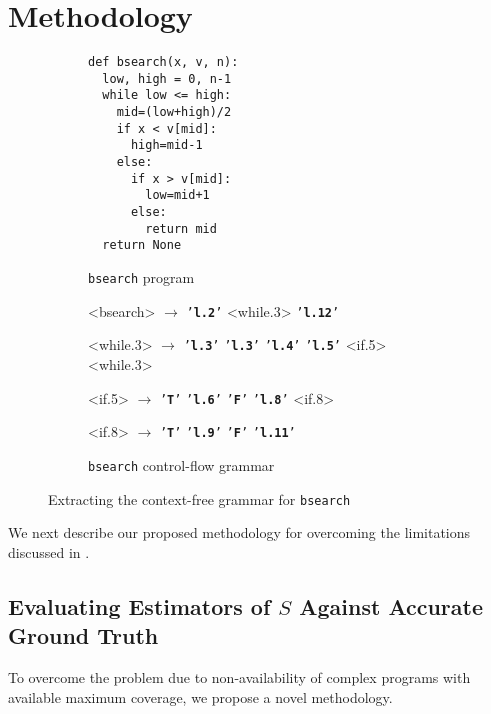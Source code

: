 \documentclass[conference]{IEEEtran}
\def\<#1>{\texttt{#1}}
\def\term#1{\texttt{'\textbf{#1}'}}
\begin{document}
\section{Methodology} \label{sec:method}
\begin{figure*} %
  \centering
\begin{subfigure}[h]{0.45\textwidth} %
  \centering
\begin{lstlisting}[style=Python, escapechar=|,numbersep=2pt]
def bsearch(x, v, n):
  low, high = 0, n-1
  while low <= high:
    mid=(low+high)/2
    if x < v[mid]:
      high=mid-1
    else:
      if x > v[mid]:
        low=mid+1
      else:
        return mid
  return None
\end{lstlisting}
\caption{\<bsearch> program}
\label{fig:bsearch1}
\end{subfigure}
\begin{subfigure}[h]{0.45\textwidth}   %
  \centering
\begin{grammar}%
  <bsearch> $\rightarrow$ \term{l.2} <while.3> \term{l.12}

  <while.3> $\rightarrow$ \term{l.3}
   \alt \term{l.3} \term{l.4} \term{l.5} <if.5> <while.3>

  <if.5>  $\rightarrow$  \term{T} \term{l.6}
   \alt \term{F} \term{l.8} <if.8>

  <if.8> $\rightarrow$ \term{T} \term{l.9}
   \alt \term{F} \term{l.11}
\end{grammar}
\caption{\<bsearch> control-flow grammar}
\label{fig:bsearch3}
\end{subfigure}
\caption{Extracting the context-free grammar for \<bsearch>}
\label{fig:bsearch}
\end{figure*}
We next describe our proposed methodology for overcoming the limitations discussed in .
\subsection{Evaluating Estimators of \texorpdfstring{$S$}{S} Against Accurate Ground Truth}
To overcome the problem due to non-availability of complex programs with available
maximum coverage, we propose a novel methodology.
\end{document}
